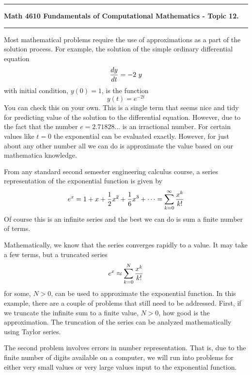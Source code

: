 \documentclass[10pt,fleqn]{article}
\begin{document}
\vskip0.1in\hrule\vskip0.1in \noindent
{\bf Math 4610 Fundamentals of Computational Mathematics  - Topic 12.}
\vskip0.1in\hrule\vskip0.1in \noindent
Most mathematical problems require the use of approximations as a part of the
solution process. For example, the solution of the simple ordinary differential
equation
\[
  {{dy}\over{dt}} = -2\ y
\]
with initial condition, \(y(0)=1\), is the function
\[
  y(t) = e^{-2t}
\]
You can check this on your own. This is a single term that seems nice and tidy
for predicting value of the solution to the differential equation. However, due
to the fact that the number \(e=2.71828...\) is an irractional number. For
certain values like \(t=0\) the exponential can be evaluated exactly. However,
for just about any other number all we can do is approximate the value based on
our mathematica knowledge.

From any standard second semester engineering calculus course, a series 
representation of the exponential function is given by
\[
  e^x = 1 + x + {1\over 2} x^2 + {1\over 6} x^3 + \cdots
      = \sum_{k=0}^\infty {{x^k}\over{k!}}
\]
Of course this is an infinite series and the best we can do is sum a finite
number of terms.

Mathematically, we know that the series converges rapidly to
a value. It may take a few terms, but a truncated series
\[
  e^x \approx \sum_{k=0}^N {{x^k}\over{k!}}
\]
for some, \(N>0\), can be used to approximate the exponential function. In this
example, there are a couple of problems that still need to be addressed. First,
if we truncate the infinite sum to a finite value, \(N>0\), how good is the
approximation. The truncation of the series can be analyzed mathematically using
Taylor series.

The second problem involves errors in number representation. That is, due to the
finite number of digits available on a computer, we will run into problems for
either very small values or very large values input to the exponential function.
\end{document}
